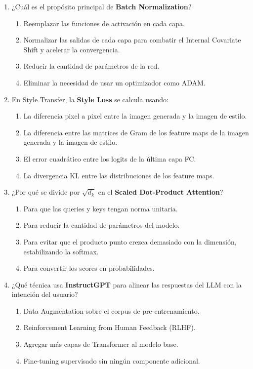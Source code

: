 \documentclass[12pt,a4paper]{article}
\begin{document}
\begin{enumerate}[label=\arabic*)]
    \item ¿Cuál es el propósito principal de \textbf{Batch Normalization}?
    \begin{enumerate}[label=\Alph*)]
        \item Reemplazar las funciones de activación en cada capa.
        \item Normalizar las salidas de cada capa para combatir el Internal Covariate Shift y acelerar la convergencia.
        \item Reducir la cantidad de parámetros de la red.
        \item Eliminar la necesidad de usar un optimizador como ADAM.
    \end{enumerate}

    \item En Style Transfer, la \textbf{Style Loss} se calcula usando:
    \begin{enumerate}[label=\Alph*)]
        \item La diferencia pixel a pixel entre la imagen generada y la imagen de estilo.
        \item La diferencia entre las matrices de Gram de los feature maps de la imagen generada y la imagen de estilo.
        \item El error cuadrático entre los logits de la última capa FC.
        \item La divergencia KL entre las distribuciones de los feature maps.
    \end{enumerate}

    \item ¿Por qué se divide por $\sqrt{d_k}$ en el \textbf{Scaled Dot-Product Attention}?
    \begin{enumerate}[label=\Alph*)]
        \item Para que las queries y keys tengan norma unitaria.
        \item Para reducir la cantidad de parámetros del modelo.
        \item Para evitar que el producto punto crezca demasiado con la dimensión, estabilizando la softmax.
        \item Para convertir los scores en probabilidades.
    \end{enumerate}

    \item ¿Qué técnica usa \textbf{InstructGPT} para alinear las respuestas del LLM con la intención del usuario?
    \begin{enumerate}[label=\Alph*)]
        \item Data Augmentation sobre el corpus de pre-entrenamiento.
        \item Reinforcement Learning from Human Feedback (RLHF).
        \item Agregar más capas de Transformer al modelo base.
        \item Fine-tuning supervisado sin ningún componente adicional.
    \end{enumerate}


\end{enumerate}
\end{document}
